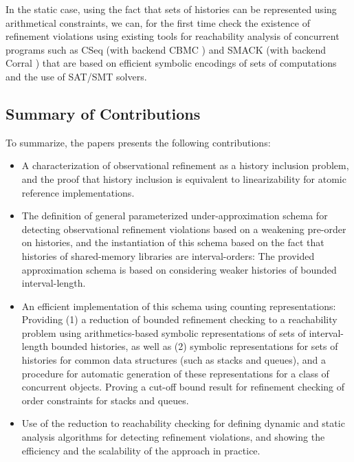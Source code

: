 In the static case, using the fact that sets of histories can be represented
using arithmetical constraints, we can, for the first time check the existence
of refinement violations using existing tools for reachability analysis of
concurrent programs such as CSeq \cite{} (with backend CBMC \cite{}) and SMACK
\cite{} (with backend Corral \cite{}) that are based on efficient symbolic
encodings of sets of computations and the use of SAT/SMT solvers.

\subsection{Summary of Contributions}

To summarize, the papers presents the following contributions:
\begin{itemize}

  \item A characterization of observational refinement as a history inclusion
  problem, and the proof that history inclusion is equivalent to
  linearizability for atomic reference implementations.

  \item The definition of general parameterized under-approximation schema for
  detecting observational refinement violations based on a weakening pre-order
  on histories, and the instantiation of this schema based on the fact that
  histories of shared-memory libraries are interval-orders: The provided
  approximation schema is based on considering weaker histories of bounded
  interval-length.

  \item An efficient implementation of this schema using counting
  representations: Providing (1) a reduction of bounded refinement checking to
  a reachability problem using arithmetics-based symbolic representations of
  sets of interval-length bounded histories, as well as (2) symbolic
  representations for sets of histories for common data structures (such as
  stacks and queues), and a procedure for automatic generation of these
  representations for a class of concurrent objects. Proving a cut-off bound
  result for refinement checking of order constraints for stacks and queues.

  \item Use of the reduction to reachability checking for defining dynamic and
  static analysis algorithms for detecting refinement violations, and showing
  the efficiency and the scalability of the approach in practice.

\end{itemize}
